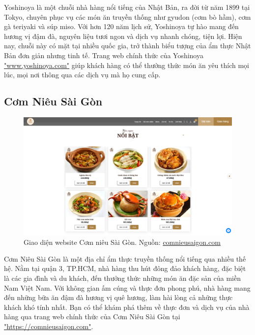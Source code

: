 Yoshinoya là một chuỗi nhà hàng nổi tiếng của Nhật Bản, ra đời từ năm 1899 tại Tokyo, chuyên phục vụ các món ăn truyền thống như gyudon (cơm bò hầm), cơm gà teriyaki và súp miso. Với hơn 120 năm lịch sử, Yoshinoya tự hào mang đến hương vị đậm đà, nguyên liệu tươi ngon và dịch vụ nhanh chóng, tiện lợi. Hiện nay, chuỗi này có mặt tại nhiều quốc gia, trở thành biểu tượng của ẩm thực Nhật Bản đơn giản nhưng tinh tế. Trang web chính thức của Yoshinoya \href{www.yoshinoya.com}{"www.yoshinoya.com"}  giúp khách hàng có thể thưởng thức món ăn yêu thích mọi lúc, mọi nơi thông qua các dịch vụ mà họ cung cấp.

\subsection{Cơm Niêu Sài Gòn}

\begin{figure}[H]
    \centering
    \includegraphics[width=15cm]{Images/comnieusaigon.png}
    \vspace{0.5cm}
    \caption{Giao diện website Cơm niêu Sài Gòn. Nguồn: \href{https://comnieusaigon.com}{comnieusaigon.com}}
    \label{fig:my_label}
\end{figure}

Cơm Niêu Sài Gòn là một địa chỉ ẩm thực truyền thống nổi tiếng qua nhiều thế hệ. Nằm tại quận 3, TP.HCM, nhà hàng thu hút đông đảo khách hàng, đặc biệt là các gia đình và du khách, đến thưởng thức những món ăn đặc sản của miền Nam Việt Nam. Với không gian ấm cúng và thực đơn phong phú, nhà hàng mang đến những bữa ăn đậm đà hương vị quê hương, làm hài lòng cả những thực khách khó tính nhất. Bạn có thể khám phá thêm về thực đơn và dịch vụ của nhà hàng qua trang web chính thức của Cơm Niêu Sài Gòn tại \href{https://comnieusaigon.com}{"https://comnieusaigon.com"}.


